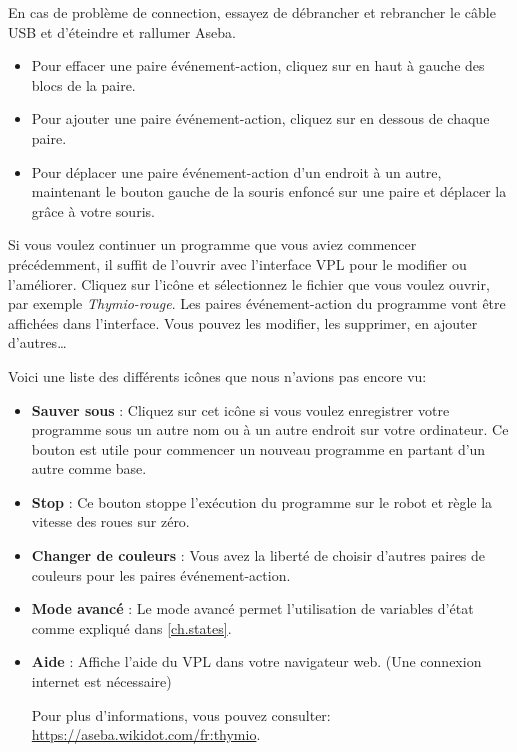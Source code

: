 En cas de problème de connection, essayez de débrancher et rebrancher le câble USB et d'éteindre et rallumer Aseba.


\begin{itemize}
\item Pour effacer une paire événement-action, cliquez sur  en haut à gauche des blocs de la paire.
\item Pour ajouter une paire événement-action, cliquez sur  en dessous de chaque paire.
\item Pour déplacer une paire événement-action d'un endroit à un autre, maintenant le bouton gauche de la souris enfoncé sur une paire et déplacer la grâce à votre souris.
\end{itemize}


Si vous voulez continuer un programme que vous aviez commencer précédemment, il suffit de l'ouvrir avec l'interface VPL pour le modifier ou l'améliorer. Cliquez sur l'icône  et sélectionnez le fichier que vous voulez ouvrir, par exemple \textit{Thymio-rouge}. Les paires événement-action du programme vont être affichées dans l'interface. Vous pouvez les modifier, les supprimer, en ajouter d'autres\ldots


Voici une liste des différents icônes que nous n'avions pas encore vu:

\begin{itemize}

\item \textbf{Sauver sous} : Cliquez sur cet icône si vous voulez enregistrer votre programme sous un autre nom ou à un autre endroit sur votre ordinateur. Ce bouton est utile pour commencer un nouveau programme en partant d'un autre comme base.

\item \textbf{Stop} : Ce bouton stoppe l'exécution du programme sur le robot et règle la vitesse des roues sur zéro.

\item \textbf{Changer de couleurs} : Vous avez la liberté de choisir d'autres paires de couleurs pour les paires événement-action.

\item \textbf{Mode avancé} : Le mode avancé permet l'utilisation de variables d'état comme expliqué dans \cref{ch.states}.

\item \textbf{Aide} : Affiche l'aide du VPL dans votre navigateur web. (Une connexion internet est nécessaire)

Pour plus d'informations, vous pouvez consulter:
\url{https://aseba.wikidot.com/fr:thymio}.

\end{itemize}
